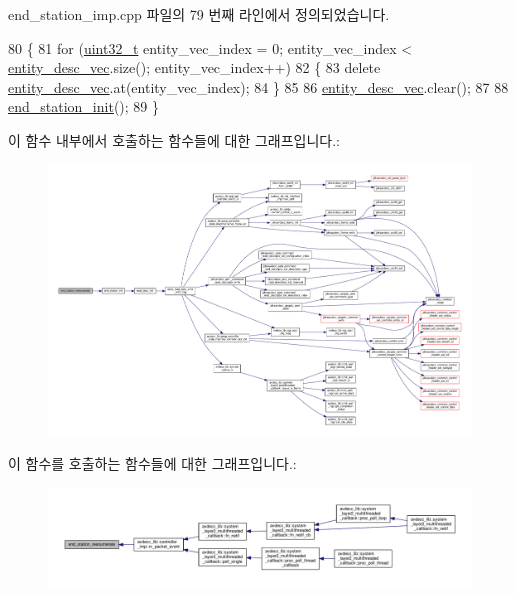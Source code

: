 end\+\_\+station\+\_\+imp.\+cpp 파일의 79 번째 라인에서 정의되었습니다.


\begin{DoxyCode}
80 \{
81     \textcolor{keywordflow}{for} (\hyperlink{parse_8c_a6eb1e68cc391dd753bc8ce896dbb8315}{uint32\_t} entity\_vec\_index = 0; entity\_vec\_index < 
      \hyperlink{classavdecc__lib_1_1end__station__imp_a72edab41bc56e3c1757944a7df188a3d}{entity\_desc\_vec}.size(); entity\_vec\_index++)
82     \{
83         \textcolor{keyword}{delete} \hyperlink{classavdecc__lib_1_1end__station__imp_a72edab41bc56e3c1757944a7df188a3d}{entity\_desc\_vec}.at(entity\_vec\_index);
84     \}
85 
86     \hyperlink{classavdecc__lib_1_1end__station__imp_a72edab41bc56e3c1757944a7df188a3d}{entity\_desc\_vec}.clear();
87 
88     \hyperlink{classavdecc__lib_1_1end__station__imp_a86c3a7a61fd1446d88bd8c33067b1c0c}{end\_station\_init}();
89 \}
\end{DoxyCode}


이 함수 내부에서 호출하는 함수들에 대한 그래프입니다.\+:
\nopagebreak
\begin{figure}[H]
\begin{center}
\leavevmode
\includegraphics[width=350pt]{classavdecc__lib_1_1end__station__imp_ac0261f128375a81d95acbc19ac243215_cgraph}
\end{center}
\end{figure}




이 함수를 호출하는 함수들에 대한 그래프입니다.\+:
\nopagebreak
\begin{figure}[H]
\begin{center}
\leavevmode
\includegraphics[width=350pt]{classavdecc__lib_1_1end__station__imp_ac0261f128375a81d95acbc19ac243215_icgraph}
\end{center}
\end{figure}



